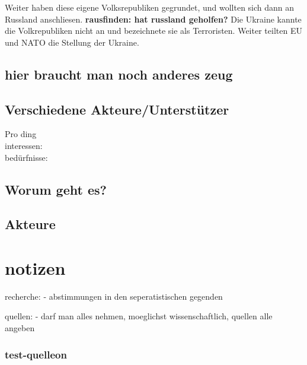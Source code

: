 \documentclass{article}
\begin{document}
Weiter haben diese eigene Volksrepubliken gegrundet, und wollten sich dann an
Russland anschliesen. \textbf{rausfinden: hat russland geholfen?}
Die Ukraine kannte die Volkrepubliken nicht an und bezeichnete sie als Terroristen.
Weiter teilten EU und NATO die Stellung der Ukraine.


\subsection{hier braucht man noch anderes zeug}

\subsection{Verschiedene Akteure/Unterst\"utzer}
Pro ding\\
interessen:\\
bed\"urfnisse:


\subsection{Worum geht es?}


\subsection{Akteure}









\section{notizen}
recherche:
- abstimmungen in den seperatistischen gegenden


quellen:
- darf man alles nehmen, moeglichst wissenschaftlich, quellen alle angeben
\subsubsection{test-quelleon}
~\cite{was-ist-geschehen}
~\cite{what-could-come-next}
~\cite{open-source-intelligence}
~\cite{putins-war}
~\cite{avoiding-a-long-war}
~\cite{how-big-is-the-storm}
~\cite{why-did-putin}



\clearpage
\printbibliography
\end{document}

